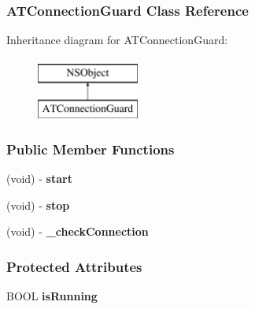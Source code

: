 \hypertarget{interface_a_t_connection_guard}{
\subsubsection{ATConnectionGuard Class Reference}
\label{interface_a_t_connection_guard}
}
Inheritance diagram for ATConnectionGuard:\begin{figure}[h]
\begin{center}
\leavevmode
\includegraphics[height=2.000000cm]{interface_a_t_connection_guard}
\end{center}
\end{figure}
\subsubsection*{Public Member Functions}
\begin{DoxyCompactItemize}
\item 
\hypertarget{interface_a_t_connection_guard_a96b67e50d661e8e0edf6dd280dd03a7d}{
(void) -\/ {\bfseries start}}
\label{interface_a_t_connection_guard_a96b67e50d661e8e0edf6dd280dd03a7d}

\item 
\hypertarget{interface_a_t_connection_guard_a690563a6d28297f42209c29e016a961b}{
(void) -\/ {\bfseries stop}}
\label{interface_a_t_connection_guard_a690563a6d28297f42209c29e016a961b}

\item 
\hypertarget{interface_a_t_connection_guard_adc0892e3439bd48580bc8171d3cd9c5c}{
(void) -\/ {\bfseries \_\-checkConnection}}
\label{interface_a_t_connection_guard_adc0892e3439bd48580bc8171d3cd9c5c}

\end{DoxyCompactItemize}
\subsubsection*{Protected Attributes}
\begin{DoxyCompactItemize}
\item 
\hypertarget{interface_a_t_connection_guard_af213d51050cb2c17a7f85715fa602323}{
BOOL {\bfseries isRunning}}
\label{interface_a_t_connection_guard_af213d51050cb2c17a7f85715fa602323}

\end{DoxyCompactItemize}
